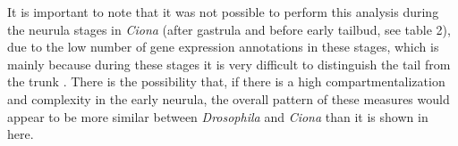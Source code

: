 It is important to note that it was not possible to perform this analysis during the neurula stages in \textit{Ciona} (after gastrula and before early tailbud, see table 2), due to the low number of gene expression annotations in these stages, which is mainly because during these stages it is very difficult to distinguish the tail from the trunk \citep{Nakamura2012}.
There is the possibility that, if there is a high compartmentalization and complexity in the early neurula, the overall pattern of these measures would appear to be more similar between \textit{Drosophila} and \textit{Ciona} than it is shown in here. 
